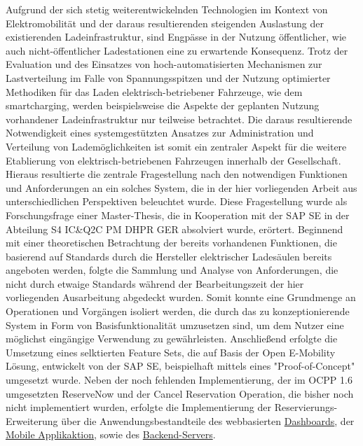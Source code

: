 
\Abstract
Aufgrund der sich stetig weiterentwickelnden Technologien im Kontext von Elektromobilit\"at und der daraus resultierenden steigenden Auslastung der existierenden Ladeinfrastruktur, sind Engp\"asse in der Nutzung \"offentlicher, wie auch nicht-\"offentlicher Ladestationen eine zu erwartende Konsequenz. 
Trotz der Evaluation und des Einsatzes von hoch-automatisierten Mechanismen zur Lastverteilung im Falle von Spannungsspitzen und der Nutzung optimierter Methodiken f\"ur das Laden elektrisch-betriebener Fahrzeuge, wie dem \Gls{smartcharging}, werden beispielsweise die Aspekte der geplanten Nutzung vorhandener Ladeinfrastruktur nur teilweise betrachtet. 
Die daraus resultierende Notwendigkeit eines systemgest\"utzten Ansatzes zur Administration und Verteilung von Ladem\"oglichkeiten ist somit ein zentraler Aspekt f\"ur die weitere Etablierung von elektrisch-betriebenen Fahrzeugen innerhalb der Gesellschaft.
Hieraus resultierte die zentrale Fragestellung nach den notwendigen Funktionen und Anforderungen an ein solches System, die in der hier vorliegenden Arbeit aus unterschiedlichen Perspektiven beleuchtet wurde. 
Diese Fragestellung wurde als Forschungsfrage einer Master-Thesis, die in Kooperation mit der SAP SE in der Abteilung S4 IC\&Q2C PM DHPR GER absolviert wurde, er\"ortert.
Beginnend mit einer theoretischen Betrachtung der bereits vorhandenen Funktionen, die basierend auf Standards durch die Hersteller elektrischer Lades\"aulen bereits angeboten werden, folgte die Sammlung und Analyse von Anforderungen, die nicht durch etwaige Standards w\"ahrend der Bearbeitungszeit der hier vorliegenden Ausarbeitung abgedeckt wurden.
Somit konnte eine Grundmenge an Operationen und Vorg\"angen isoliert werden, die durch das zu konzeptionierende System in Form von  Basisfunktionalit\"at umzusetzen sind, um dem Nutzer eine m\"oglichst eing\"angige Verwendung zu gew\"ahrleisten.
Anschließend erfolgte die Umsetzung eines selktierten Feature Sets, die auf Basis der Open E-Mobility L\"osung, entwickelt von der SAP SE, beispielhaft mittels eines "Proof-of-Concept" umgesetzt wurde. 
Neben der noch fehlenden Implementierung, der im OCPP 1.6 umgesetzten ReserveNow und der Cancel Reservation Operation, die bisher noch nicht implementiert wurden, erfolgte die Implementierung der Reservierungs-Erweiterung \"uber die Anwendungsbestandteile des webbasierten \href{https://github.com/JulianHBuecher/ev-dashboard}{Dashboards}, der \href{https://github.com/JulianHBuecher/ev-mobile}{Mobile Applikaktion}, sowie des \href{https://github.com/JulianHBuecher/ev-server}{Backend-Servers}.
